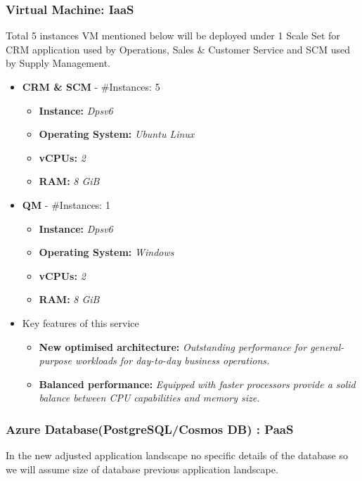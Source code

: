\documentclass{llncs}
\begin{document}
\subsubsection{Virtual Machine: IaaS} \leavevmode\newline
Total 5 instances VM mentioned below will be deployed under 1 Scale Set for CRM application used by Operations, Sales \& Customer Service and SCM used by Supply Management.
\begin{itemize}
    \item \textbf{CRM \& SCM} - \#Instances: 5
          \begin{itemize}
              \item \textbf{Instance:} \textit{Dpsv6}
              \item  \textbf{Operating System:} \textit{Ubuntu Linux}
              \item  \textbf{vCPUs:} \textit{2}
              \item  \textbf{RAM:} \textit{8 GiB}
          \end{itemize}
    \item \textbf{QM} - \#Instances: 1
          \begin{itemize}
                \item \textbf{Instance:} \textit{Dpsv6}
                \item  \textbf{Operating System:} \textit{Windows}
                \item  \textbf{vCPUs:} \textit{2}
                \item  \textbf{RAM:} \textit{8 GiB}
          \end{itemize}
    \item Key features of this service
        \begin{itemize}
            \item  \textbf{New optimised architecture:} \textit{Outstanding performance for general-purpose workloads for day-to-day business operations.}
            \item  \textbf{Balanced performance:} \textit{Equipped with faster processors provide a solid balance between CPU capabilities and memory size.}
        \end{itemize}
\end{itemize}

\subsubsection{Azure Database(PostgreSQL/Cosmos DB) : PaaS} \leavevmode\newline
In the new adjusted application landscape no specific details of the database so we will assume size of database previous application landscape.
\end{document}
